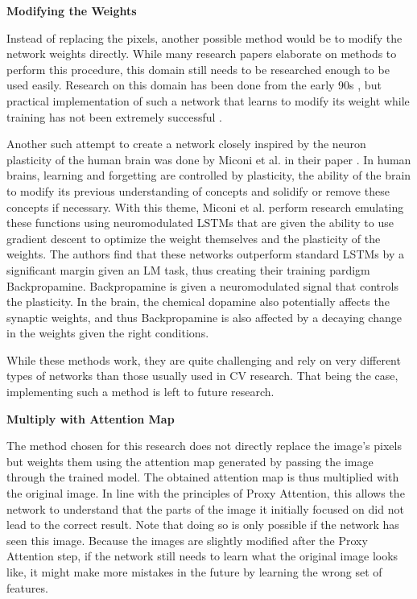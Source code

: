 \documentclass[a4paper,11pt,openright]{book}
\begin{document}

\textbf{Modifying the Weights} 

Instead of replacing the pixels, another possible method would be to modify the network weights directly. While many research papers elaborate on methods to perform this procedure, this domain still needs to be researched enough to be used easily. Research on this domain has been done from the early 90s \cite{schmidhuberSelfReferentialWeightMatrix1993}, but practical implementation of such a network that learns to modify its weight while training has not been extremely successful \cite{irieModernSelfReferentialWeight2022}. 

Another such attempt to create a network closely inspired by the neuron plasticity of the human brain was done by Miconi et al. in their paper \cite{miconiBackpropamineTrainingSelfmodifying2020}. In human brains, learning and forgetting are controlled by plasticity, the ability of the brain to modify its previous understanding of concepts and solidify or remove these concepts if necessary. With this theme, Miconi et al. perform research emulating these functions using neuromodulated LSTMs that are given the ability to use gradient descent to optimize the weight themselves and the plasticity of the weights. The authors find that these networks outperform standard LSTMs by a significant margin given an LM task, thus creating their training pardigm Backpropamine. Backpropamine is given a neuromodulated signal that controls the plasticity. In the brain, the chemical dopamine also potentially affects the synaptic weights, and thus Backpropamine is also affected by a decaying change in the weights given the right conditions.

While these methods work, they are quite challenging and rely on very different types of networks than those usually used in CV research. That being the case, implementing such a method is left to future research.

\textbf{Multiply with Attention Map} \label{sec:mult_attention}

The method chosen for this research does not directly replace the image's pixels but weights them using the attention map generated by passing the image through the trained model.
The obtained attention map is thus multiplied with the original image. In line with the principles of Proxy Attention, this allows the network to understand that the parts of the image it initially focused on did not lead to the correct result. Note that doing so is only possible if the network has seen this image. Because the images are slightly modified after the Proxy Attention step, if the network still needs to learn what the original image looks like, it might make more mistakes in the future by learning the wrong set of features.
\end{document}

